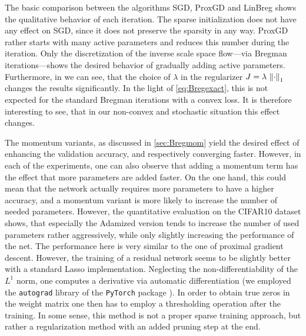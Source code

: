 The basic comparison between the  algorithms SGD, ProxGD and LinBreg shows the qualitative behavior of each iteration. The sparse initialization does not have any effect on SGD, since it does not preserve the sparsity in any way. ProxGD rather starts with many active parameters and reduces this number during the iteration. Only the discretization of the inverse scale space flow---via Bregman iterations---shows the desired behavior of gradually adding active parameters. Furthermore, in \cite[Fig. 2]{bungert2022bregman} we can see, that the choice of $\lambda$ in the regularizer $J = \lambda\, \left\|\cdot\right\|_1$ changes the results significantly. In the light of \cref{eq:Bregexact}, this is not expected for the standard Bregman iterations with a convex loss. It is therefore interesting to see, that in our non-convex and stochastic situation this effect changes.

The momentum variants, as discussed in \cref{sec:Bregmom} yield the desired effect of enhancing the validation accuracy, and respectively converging faster. However, in each  of the experiments, one can also observe that adding a momentum term has the effect that more parameters are added faster. On the one hand, this could mean that the network actually requires more parameters to have a higher accuracy, and a momentum variant is more likely to increase the number of needed parameters. However, the quantitative evaluation on the CIFAR10 dataset \cite{krizhevsky2009learning} shows, that especially the Adamized version tends to increase the number of used parameters rather aggressively, while only slightly increasing the performance of the net. The performance here is very similar to the one of proximal gradient descent. However, the training of a residual network seems to be slightly better with a standard Lasso implementation. Neglecting the non-differentiability of the $L^1$ norm, one computes a derivative via automatic differentiation \cite{rall1981automatic, maclaurin2015autograd} (we employed the \texttt{autograd} library of the \texttt{PyTorch} package \cite{paszke2019pytorch}). In order to obtain true zeros in the weight matrix one then has to employ a thresholding operation after the training. In some sense, this method is not a proper sparse training approach, but rather a regularization method with an added pruning step at the end.

